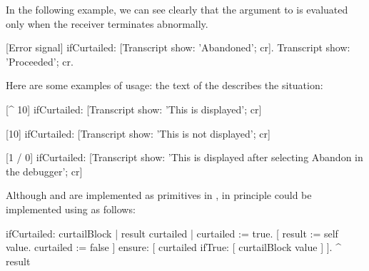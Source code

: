 \documentclass[a4paper,10pt,twoside]{book}
\begin{document}
In the following example, we can see clearly that the argument to  is evaluated only when the receiver terminates abnormally.
\begin{code}{}
[Error signal] ifCurtailed: [Transcript show: 'Abandoned'; cr].
Transcript show: 'Proceeded'; cr.
\end{code}


Here are some  examples of  usage: the text of the  describes the situation:

\begin{code}{}
[^ 10] ifCurtailed: [Transcript show: 'This is displayed'; cr] 

[10] ifCurtailed: [Transcript show: 'This is not displayed'; cr] 

[1 / 0] ifCurtailed: [Transcript show: 'This is displayed after selecting Abandon in the debugger'; cr]
\end{code}

Although  and  are implemented as primitives in \pharo, 
in principle  could be implemented using  as follows:

\begin{code}{}
ifCurtailed: curtailBlock
	| result curtailed |
	curtailed := true.
	[	result := self value.
		curtailed := false
	]	ensure: [ curtailed ifTrue: [ curtailBlock value ] ].
	^ result
\end{code}
\end{document}
